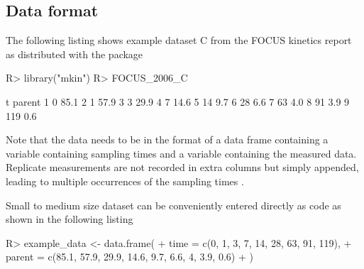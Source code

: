 \documentclass[12pt,a4paper]{article}
\begin{document}
\subsection{Data format}

The following listing shows example dataset C from the FOCUS kinetics
report as distributed with the  package

\begin{Schunk}
\begin{Sinput}
R> library("mkin")
R> FOCUS_2006_C
\end{Sinput}
\begin{Soutput}
    t parent
1   0   85.1
2   1   57.9
3   3   29.9
4   7   14.6
5  14    9.7
6  28    6.6
7  63    4.0
8  91    3.9
9 119    0.6
\end{Soutput}
\end{Schunk}

Note that the data needs to be in the format of a data frame containing
a variable  containing sampling times and a variable
 containing the measured data. Replicate measurements are
not recorded in extra columns but simply appended, leading to multiple
occurrences of the sampling times .

Small to medium size dataset can be conveniently entered directly as \RR{} code
as shown in the following listing

\begin{Schunk}
\begin{Sinput}
R> example_data <- data.frame(
+   time = c(0, 1, 3, 7, 14, 28, 63, 91, 119),
+   parent = c(85.1, 57.9, 29.9, 14.6, 9.7, 6.6, 4, 3.9, 0.6)
+ )
\end{Sinput}
\end{Schunk}





\end{document}
